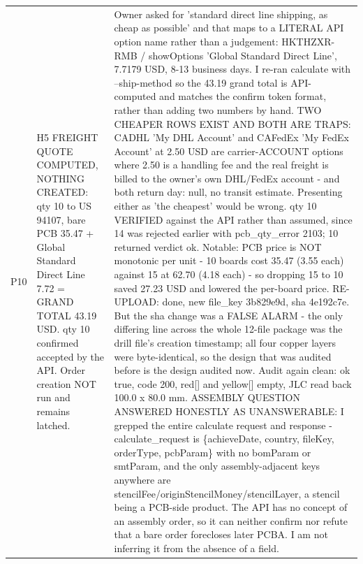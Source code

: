 \documentclass[11pt,a4paper]{article}
\begin{document}
{\begin{longtable}{lp{5.2cm}p{7.2cm}}
P10 & H5 FREIGHT QUOTE COMPUTED, NOTHING CREATED: qty 10 to US 94107, bare PCB 35.47 + Global Standard Direct Line 7.72 = GRAND TOTAL 43.19 USD. qty 10 confirmed accepted by the API. Order creation NOT run and remains latched. & Owner asked for 'standard direct line shipping, as cheap as possible' and that maps to a LITERAL API option name rather than a judgement: HKTHZXR-RMB / showOptions 'Global Standard Direct Line', 7.7179 USD, 8-13 business days. I re-ran calculate with --ship-method so the 43.19 grand total is API-computed and matches the confirm token format, rather than adding two numbers by hand. TWO CHEAPER ROWS EXIST AND BOTH ARE TRAPS: CADHL 'My DHL Account' and CAFedEx 'My FedEx Account' at 2.50 USD are carrier-ACCOUNT options where 2.50 is a handling fee and the real freight is billed to the owner's own DHL/FedEx account - and both return day: null, no transit estimate. Presenting either as 'the cheapest' would be wrong. qty 10 VERIFIED against the API rather than assumed, since 14 was rejected earlier with pcb\_qty\_error 2103; 10 returned verdict ok. Notable: PCB price is NOT monotonic per unit - 10 boards cost 35.47 (3.55 each) against 15 at 62.70 (4.18 each) - so dropping 15 to 10 saved 27.23 USD and lowered the per-board price. RE-UPLOAD: done, new file\_key 3b829e9d, sha 4e192c7e. But the sha change was a FALSE ALARM - the only differing line across the whole 12-file package was the drill file's creation timestamp; all four copper layers were byte-identical, so the design that was audited before is the design audited now. Audit again clean: ok true, code 200, red{[}{]} and yellow{[}{]} empty, JLC read back 100.0 x 80.0 mm. ASSEMBLY QUESTION ANSWERED HONESTLY AS UNANSWERABLE: I grepped the entire calculate request and response - calculate\_request is \{achieveDate, country, fileKey, orderType, pcbParam\} with no bomParam or smtParam, and the only assembly-adjacent keys anywhere are stencilFee/originStencilMoney/stencilLayer, a stencil being a PCB-side product. The API has no concept of an assembly order, so it can neither confirm nor refute that a bare order forecloses later PCBA. I am not inferring it from the absence of a field. \\

\end{longtable}}
\end{document}
